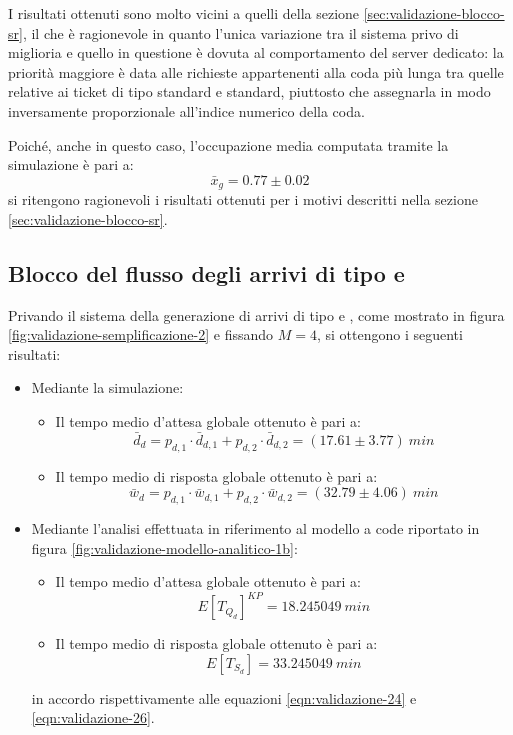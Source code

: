 I risultati ottenuti sono molto vicini a quelli della sezione \ref{sec:validazione-blocco-sr}, il che è ragionevole in quanto l'unica variazione tra il sistema privo di miglioria e quello in questione è dovuta al comportamento del server dedicato: la priorità maggiore è data alle richieste appartenenti alla coda più lunga tra quelle relative ai ticket di tipo \uo{} standard e \pp{} standard, piuttosto che assegnarla in modo inversamente proporzionale all'indice numerico della coda.

Poiché, anche in questo caso, l'occupazione media computata tramite la simulazione è pari a:
\begin{equation}
\bar{x}_g = 0.77 \pm 0.02
\end{equation}
si ritengono ragionevoli i risultati ottenuti per i motivi descritti nella sezione \ref{sec:validazione-blocco-sr}.

\subsection{Blocco del flusso degli arrivi di tipo \uo{} e \pp{}}
Privando il sistema della generazione di arrivi di tipo \uo{} e \pp{}, come mostrato in figura \ref{fig:validazione-semplificazione-2} e fissando $M = 4$, si ottengono i seguenti risultati:
\begin{itemize}
\item Mediante la simulazione:
\begin{itemize}
\item Il tempo medio d'attesa globale ottenuto è pari a:
\begin{equation} 
\bar{d}_d = p_{d,1}\cdot \bar{d}_{d,1} + p_{d,2}\cdot \bar{d}_{d,2} = (17.61 \pm 3.77)\ min
\end{equation}
\item Il tempo medio di risposta globale ottenuto è pari a:
\begin{equation}
\bar{w}_d = p_{d,1}\cdot \bar{w}_{d,1} + p_{d,2}\cdot \bar{w}_{d,2} = (32.79 \pm 4.06)\ min
\end{equation}
\end{itemize}

\item Mediante l'analisi effettuata in riferimento al modello a code riportato in figura \ref{fig:validazione-modello-analitico-1b}:
\begin{itemize}
\item Il tempo medio d'attesa globale ottenuto è pari a:
\begin{equation}
E[T_{Q_d}]^{KP} = 18.245049\ min 
\end{equation}
\item Il tempo medio di risposta globale ottenuto è pari a:
\begin{equation}
E[T_{S_d}] = 33.245049\ min 
\end{equation}
\end{itemize}
in accordo rispettivamente alle equazioni \ref{eqn:validazione-24} e \ref{eqn:validazione-26}.
\end{itemize}

